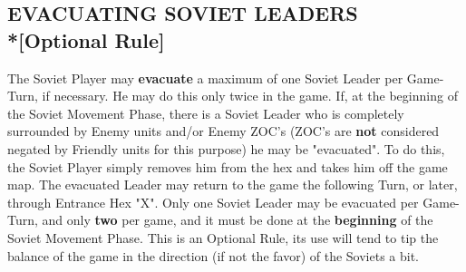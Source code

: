 \subsection{EVACUATING SOVIET LEADERS\\*{[}Optional Rule{]}}

The Soviet Player may \textbf{evacuate} a maximum of one Soviet Leader per Game-Turn, if necessary. He may do this only twice in the game. If, at the beginning of the Soviet Movement Phase, there is a Soviet Leader who is completely surrounded by Enemy units and/or Enemy ZOC's (ZOC's are \textbf{not} considered negated by Friendly units for this purpose) he may be "evacuated". To do this, the Soviet Player simply removes him from the hex and takes him off the game map. The evacuated Leader may return to the game the following Turn, or later, through Entrance Hex "X". Only one Soviet Leader may be evacuated per Game-Turn, and only \textbf{two} per game, and it must be done at the \textbf{beginning} of the Soviet Movement Phase. This is an Optional Rule, its use will tend to tip the balance of the game in the direction (if not the favor) of the Soviets a bit.

